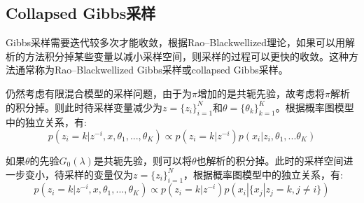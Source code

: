 \subsection{Collapsed Gibbs采样}
Gibbs采样需要迭代较多次才能收敛，根据Rao–Blackwellized理论，如果可以用解析的方法积分掉某些变量以减小采样空间，则采样的过程可以更快的收敛。这种方法通常称为Rao–Blackwellized Gibbs采样或collapsed Gibbs采样\cite{casella1996rao}。

仍然考虑有限混合模型的采样问题，由于为$\pi$增加的是共轭先验，故考虑将$\pi$解析的积分掉。则此时待采样变量减少为$z= {\{z_i\}}_{i=1}^N$和$\theta= {\{\theta_k\}}_{k=1}^K$。根据概率图模型中的独立关系，有:
\begin{equation}
p(z_i=k|z^{-i},x,\theta_1,...,\theta_K) \propto p(z_i=k|z^{-i})p(x_i|z_i,\theta_1,...\theta_K) \label{eq:finite_collapsed_gibbs_pi}
\end{equation}

如果$\theta$的先验$G_0(\lambda)$是共轭先验，则可以将$\theta$也解析的积分掉。此时的采样空间进一步变小，待采样的变量仅为$z= {\{z_i\}}_{i=1}^N$，根据概率图模型中的独立关系，有:
\begin{equation}
p(z_i=k|z^{-i},x,\theta_1,...,\theta_K) \propto p(z_i=k|z^{-i})p(x_i|\{x_j|z_j=k,j \neq i\}) \label{eq:finite_collapsed_gibbs_pi_theta}
\end{equation}